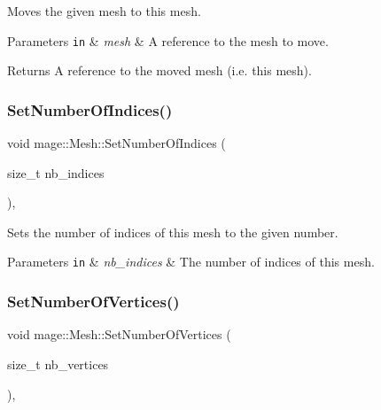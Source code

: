 Moves the given mesh to this mesh.


\begin{DoxyParams}[1]{Parameters}
\mbox{\tt in}  & {\em mesh} & A reference to the mesh to move. \\
\hline
\end{DoxyParams}
\begin{DoxyReturn}{Returns}
A reference to the moved mesh (i.\+e. this mesh). 
\end{DoxyReturn}
\hypertarget{classmage_1_1_mesh_a87ddba20dbdc57b168d38b02e7ccfdd0}{}\label{classmage_1_1_mesh_a87ddba20dbdc57b168d38b02e7ccfdd0} 
\subsubsection{\texorpdfstring{Set\+Number\+Of\+Indices()}{SetNumberOfIndices()}}
{\footnotesize\ttfamily void mage\+::\+Mesh\+::\+Set\+Number\+Of\+Indices (\begin{DoxyParamCaption}\item[{size\+\_\+t}]{nb\+\_\+indices }\end{DoxyParamCaption})\hspace{0.3cm}{\ttfamily [protected]}, {\ttfamily [noexcept]}}

Sets the number of indices of this mesh to the given number.


\begin{DoxyParams}[1]{Parameters}
\mbox{\tt in}  & {\em nb\+\_\+indices} & The number of indices of this mesh. \\
\hline
\end{DoxyParams}
\hypertarget{classmage_1_1_mesh_abdb9050ecea85108b1e890a68aa5b656}{}\label{classmage_1_1_mesh_abdb9050ecea85108b1e890a68aa5b656} 
\subsubsection{\texorpdfstring{Set\+Number\+Of\+Vertices()}{SetNumberOfVertices()}}
{\footnotesize\ttfamily void mage\+::\+Mesh\+::\+Set\+Number\+Of\+Vertices (\begin{DoxyParamCaption}\item[{size\+\_\+t}]{nb\+\_\+vertices }\end{DoxyParamCaption})\hspace{0.3cm}{\ttfamily [protected]}, {\ttfamily [noexcept]}}

